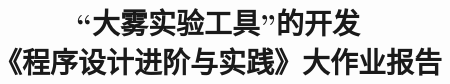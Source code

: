 \documentclass[twocolumn]{article}
\title{%
“大雾实验工具”的开发\\
\large《程序设计进阶与实践》大作业报告}
\author{}
\date{}
\begin{document}
\twocolumn[\maketitle

\vskip\baselineskip]







% 
\end{document}
